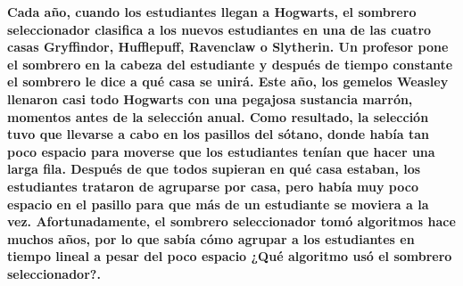 \textbf{Cada año, cuando los estudiantes llegan a Hogwarts, el sombrero seleccionador clasifica a los
nuevos estudiantes en una de las cuatro casas Gryffindor, Hufflepuff, Ravenclaw o Slytherin.
Un profesor pone el sombrero en la cabeza del estudiante y después de tiempo constante el
sombrero le dice a qué casa se unirá. Este año, los gemelos Weasley llenaron casi todo Hogwarts
con una pegajosa sustancia marrón, momentos antes de la selección anual. Como resultado, la
selección tuvo que llevarse a cabo en los pasillos del sótano, donde había tan poco espacio para
moverse que los estudiantes tenían que hacer una larga fila. Después de que todos supieran
en qué casa estaban, los estudiantes trataron de agruparse por casa, pero había muy poco
espacio en el pasillo para que más de un estudiante se moviera a la vez. Afortunadamente,
el sombrero seleccionador tomó algoritmos hace muchos años, por lo que sabía cómo agrupar
a los estudiantes en tiempo lineal a pesar del poco espacio ¿Qué algoritmo usó el sombrero
seleccionador?.}\\

\textcolor{bibi}{}
\begin{quote}
\end{quote}
